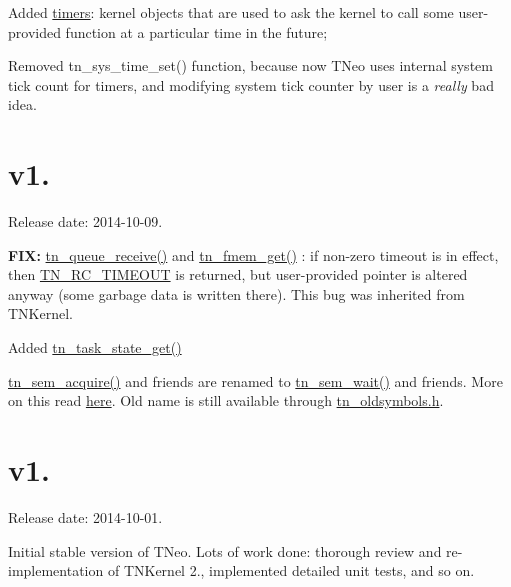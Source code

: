 \begin{DoxyItemize}
\item Added \hyperlink{tn__timer_8h}{timers}\+: kernel objects that are used to ask the kernel to call some user-\/provided function at a particular time in the future;
\item Removed {\ttfamily tn\+\_\+sys\+\_\+time\+\_\+set()} function, because now T\+Neo uses internal system tick count for timers, and modifying system tick counter by user is a {\itshape really} bad idea.
\end{DoxyItemize}\hypertarget{changelog_changelog_v1_01}{}\section{v1.}\label{changelog_changelog_v1_01}
Release date\+: 2014-\/10-\/09.


\begin{DoxyItemize}
\item {\bfseries F\+IX\+:} {\ttfamily \hyperlink{tn__dqueue_8h_ab47ed49af7dffc5a71eaabd25422d0e4}{tn\+\_\+queue\+\_\+receive()}} and {\ttfamily \hyperlink{tn__fmem_8h_a2ecd094041dbd0e92d61b852b7952444}{tn\+\_\+fmem\+\_\+get()}} \+: if non-\/zero {\ttfamily timeout} is in effect, then {\ttfamily \hyperlink{tn__common_8h_aa43bd3da1ad4c1e61224b5f23b369876a5b4d73fde6b5d1c9579c02e6aafce1fb}{T\+N\+\_\+\+R\+C\+\_\+\+T\+I\+M\+E\+O\+UT}} is returned, but user-\/provided pointer is altered anyway (some garbage data is written there). This bug was inherited from T\+N\+Kernel.
\item Added {\ttfamily \hyperlink{tn__tasks_8h_a18408d825c0dab03511f3aaeeb3ffbb3}{tn\+\_\+task\+\_\+state\+\_\+get()}}
\item {\ttfamily \hyperlink{tn__oldsymbols_8h_abdc5c428590ff525cdb566da613015ce}{tn\+\_\+sem\+\_\+acquire()}} and friends are renamed to {\ttfamily \hyperlink{tn__sem_8h_acfed2a27719c87638d2eb6edfdeea150}{tn\+\_\+sem\+\_\+wait()}} and friends. More on this read \hyperlink{tnkernel_diff_tnkernel_diff_api_rename_sem}{here}. Old name is still available through {\ttfamily \hyperlink{tn__oldsymbols_8h}{tn\+\_\+oldsymbols.\+h}}.
\end{DoxyItemize}\hypertarget{changelog_changelog_v1_0}{}\section{v1.}\label{changelog_changelog_v1_0}
Release date\+: 2014-\/10-\/01.


\begin{DoxyItemize}
\item Initial stable version of T\+Neo. Lots of work done\+: thorough review and re-\/implementation of T\+N\+Kernel 2., implemented detailed unit tests, and so on. 
\end{DoxyItemize}